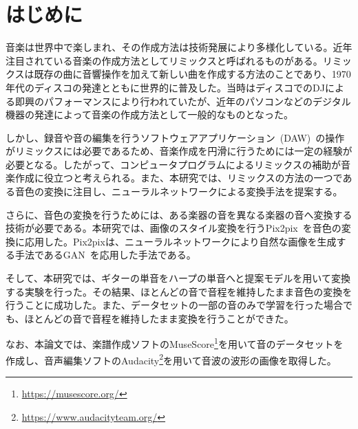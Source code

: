 \chapter{はじめに}

音楽は世界中で楽しまれ、その作成方法は技術発展により多様化している。近年注目されている音楽の作成方法としてリミックスと呼ばれるものがある。リミックスは既存の曲に音響操作を加えて新しい曲を作成する方法のことであり、1970年代のディスコの発達とともに世界的に普及した。当時はディスコでのDJによる即興のパフォーマンスにより行われていたが、近年のパソコンなどのデジタル機器の発達によって音楽の作成方法として一般的なものとなった。

しかし、録音や音の編集を行うソフトウェアアプリケーション~(DAW)~の操作がリミックスには必要であるため、音楽作成を円滑に行うためには一定の経験が必要となる。したがって、コンピュータプログラムによるリミックスの補助が音楽作成に役立つと考えられる。また、本研究では、リミックスの方法の一つである音色の変換に注目し、ニューラルネットワークによる変換手法を提案する。

さらに、音色の変換を行うためには、ある楽器の音を異なる楽器の音へ変換する技術が必要である。本研究では、画像のスタイル変換を行うPix2pix~\cite{pix2pix}を音色の変換に応用した。Pix2pixは、ニューラルネットワークにより自然な画像を生成する手法であるGAN~\cite{GAN}を応用した手法である。

そして、本研究では、ギターの単音をハープの単音へと提案モデルを用いて変換する実験を行った。その結果、ほとんどの音で音程を維持したまま音色の変換を行うことに成功した。また、データセットの一部の音のみで学習を行った場合でも、ほとんどの音で音程を維持したまま変換を行うことができた。

なお、本論文では、楽譜作成ソフトのMuseScore\footnote{\url{https://musescore.org/}}を用いて音のデータセットを作成し、音声編集ソフトのAudacity\footnote{\url{https://www.audacityteam.org/}}を用いて音波の波形の画像を取得した。